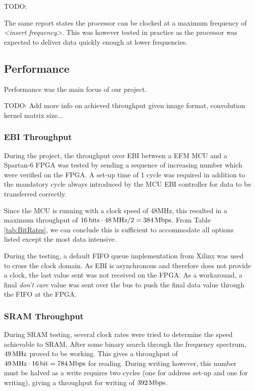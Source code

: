 TODO:

The same report states the processor can be clocked at a maximum frequency of \emph{<insert frequency>}. This was however tested in practice as the processor was expected to deliver data quickly enough at lower frequencies.

\subsection{Performance}
Performance was the main focus of our project.

TODO: Add more info on achieved throughput given image format, convolution kernel matrix size...

\subsubsection{EBI Throughput} \label{subsec:EbiThroughput}
During the project, the throughput over EBI between a EFM MCU and a Spartan-6 FPGA was tested by sending a sequence of increasing number which were verified on the FPGA.
A set-up time of 1 cycle was required in addition to the mandatory cycle always introduced by the MCU EBI controller for data to be transferred correctly.

Since the MCU is running with a clock speed of 48MHz, this resulted in a maximum throughput of $\unit[16]{bits} \cdot \unit[48]{MHz} / 2 = \unit[384]{Mbps}$.
From Table \ref{tab:BitRates}, we can conclude this is sufficient to accommodate all options listed except the most data intensive.

During the testing, a default FIFO queue implementation from Xilinx was used to cross the clock domain.
As EBI is asynchronous and therefore does not provide a clock, the last value sent was not received on the FPGA.
As a workaround, a final \textit{don't care} value was sent over the bus to push the final data value through the FIFO at the FPGA.

\subsubsection{SRAM Throughput} \label{subsec:SramThroughput}
During SRAM testing, several clock rates were tried to determine the speed achievable to SRAM.
After some binary search through the frequency spectrum, $\unit[49]{MHz}$ proved to be working.
This gives a throughput of $\unit[49]{MHz}\cdot\unit[16]{bit} = \unit[784]{Mbps}$ for reading.
During writing however, this number must be halved as a write requires two cycles (one for address set-up and one for writing), giving a throughput for writing of $\unit[392]{Mbps}$.
